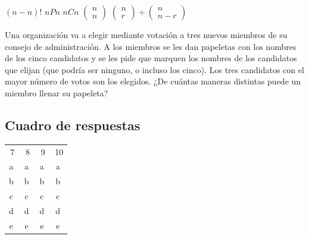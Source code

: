 \documentclass[10pt,addpoints]{exam}
\begin{document}
\begin{questions}
\begin{oneparchoices}
\choice $(n-n)!$
\CorrectChoice $nPn$
\choice $nCn$
\choice $\left(\begin{array}{c}
n\\
n
\end{array}
\right)$
\choice $\left(\begin{array}{c}
n\\
r
\end{array}\right)\div \left(\begin{array}{c}
n\\
n-r
\end{array}\right) $
\end{oneparchoices}
\question Una organización va a elegir mediante votación a tres nuevos miembros de su consejo de administración. A los miembros se les dan papeletas con los nombres de los cinco candidatos y se les pide que marquen los nombres de los candidatos que elijan (que podría ser ninguno, o incluso los cinco). Los tres candidatos con el mayor número de votos
son los elegidos. ¿De cuántas maneras distintas puede un miembro llenar su papeleta?

\begin{oneparchoices}
\end{oneparchoices}
\end{questions}
\begin{center}
\section*{Cuadro de respuestas}
\begin{tabular}{cccc}
7 & 8 & 9 & 10 \\ 
\textcircled{a} & \textcircled{a} & \textcircled{a} & \textcircled{a}\\ 
\textcircled{b} & \textcircled{b} & \textcircled{b} & \textcircled{b} \\ 
\textcircled{c} & \textcircled{c} & \textcircled{c} & \textcircled{c}\\ 
\textcircled{d} & \textcircled{d} & \textcircled{d} & \textcircled{d}\\ 
\textcircled{e} & \textcircled{e} & \textcircled{e} & \textcircled{e}\\
\end{tabular}
\end{center}
\end{document}
